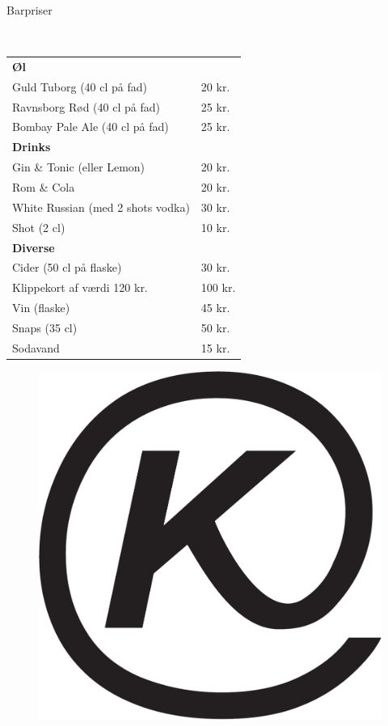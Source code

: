 \begin{flushleft}
\begin{huge}
Barpriser
\end{huge}
\\[.1cm]
\begin{table}[h!]
\begin{tabular}{p{} p{}}
\textbf{Øl} & \\
Guld Tuborg (40 cl på fad) & 20 kr.\\
Ravnsborg Rød (40 cl på fad) & 25 kr.\\
Bombay Pale Ale (40 cl på fad) & 25 kr.\\[2ex]
\textbf{Drinks} & \\
Gin \& Tonic (eller Lemon) & 20 kr.\\
Rom \& Cola & 20 kr.\\
White Russian \scriptsize{(med 2 shots vodka)} & 30 kr.\\
Shot (2 cl) & 10 kr.\\[2ex]
\textbf{Diverse} & \\
Cider (50 cl på flaske) & 30 kr. \\
Klippekort af værdi 120 kr. & 100 kr.\\
Vin (flaske) & 45 kr.\\
Snaps (35 cl) & 50 kr.\\
Sodavand & 15 kr.\\
\end{tabular}
\end{table}
\end{flushleft}
\begin{figure}[h!]
    \begin{center}
    \includegraphics[width=.45\linewidth]{../logo.pdf}
\end{center}
\end{figure}
